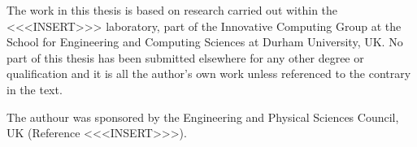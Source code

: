 \setcounter{page}{1}


\maketitle

\begin{abstract}
    \Blindtext[2]
\end{abstract}

\begin{declaration}
    The work in this thesis is based on research carried out within the <<<INSERT>>> laboratory, part of the Innovative Computing Group at the School for Engineering and Computing Sciences at Durham University, UK. No part of this thesis has been submitted elsewhere for any other degree or qualification and it is all the author's own work unless referenced to the contrary in the text.
\end{declaration}

\begin{acknowledgements}
    The authour was sponsored by the Engineering and Physical Sciences Council, UK (Reference <<<INSERT>>>).

    \Blindtext[1]
\end{acknowledgements}

\tableofcontents
\listoffigures
\listoftables
\listofalgorithms

\clearpage
\pagestyle{fancy}

\setcounter{page}{1}
